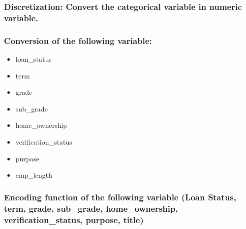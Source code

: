 \documentclass[11pt]{article}
\providecommand{\tightlist}{%
      \setlength{\itemsep}{0pt}\setlength{\parskip}{0pt}}
\begin{document}
    \hypertarget{discretization-convert-the-categorical-variable-in-numeric-variable.}{%
\subsubsection{Discretization: Convert the categorical variable in
numeric
variable.}\label{discretization-convert-the-categorical-variable-in-numeric-variable.}}

\hypertarget{conversion-of-the-following-variable}{%
\subsubsection{Conversion of the following
variable:}\label{conversion-of-the-following-variable}}

\begin{itemize}
\tightlist
\item
  loan\_status
\item
  term
\item
  grade
\item
  sub\_grade
\item
  home\_ownership
\item
  verification\_status
\item
  purpose
\item
  emp\_length
\end{itemize}

    \hypertarget{encoding-function-of-the-following-variable-loan-status-term-grade-sub_grade-home_ownership-verification_status-purpose-title}{%
\subsubsection{Encoding function of the following variable (Loan Status,
term, grade, sub\_grade, home\_ownership, verification\_status, purpose,
title)}\label{encoding-function-of-the-following-variable-loan-status-term-grade-sub_grade-home_ownership-verification_status-purpose-title}}
\end{document}
